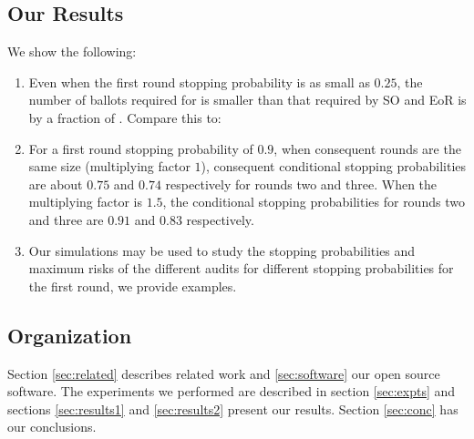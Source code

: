 \subsection{Our Results}
We show the following: 
\begin{enumerate}
\item Even when the first round stopping probability is as small as $0.25$, the number of ballots required for \Minerva is smaller than that required by SO \BRAVO and EoR \BRAVO is by a fraction of . Compare this to: 
\item For a first round stopping probability of $0.9$, when consequent \Minerva rounds are the same size (multiplying factor $1$), consequent conditional stopping probabilities are about $0.75$ and $0.74$ respectively for rounds two and three. When the multiplying factor is $1.5$, the conditional stopping probabilities for rounds two and three are $0.91$ and $0.83$ respectively. 
\item Our simulations may be used to study the stopping probabilities and maximum risks of the different audits for different stopping probabilities for the first round, we provide examples. 
\end{enumerate}

\subsection{Organization} Section \ref{sec:related} describes related work and \ref{sec:software} our open source software. The experiments we performed are described in section \ref{sec:expts} and sections \ref{sec:results1} and \ref{sec:results2} present our results. Section \ref{sec:conc} has our conclusions. 

